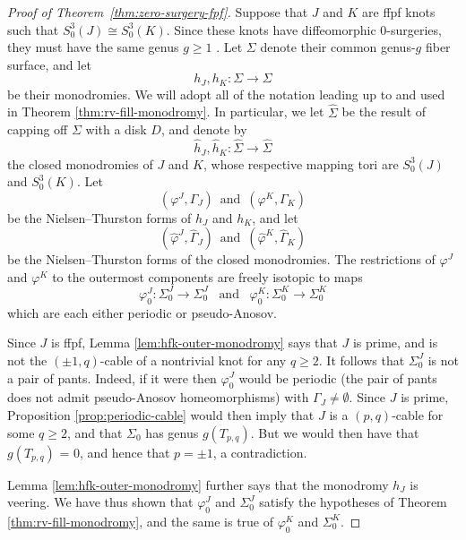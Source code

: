 \documentclass[11pt]{amsart}
\numberwithin{equation}{section}
\numberwithin{theorem}{section}
\theoremstyle{definition}
\begin{document}
\begin{proof}[Proof of Theorem~\ref{thm:zero-surgery-fpf}]
Suppose that $J$ and $ K$ are ffpf knots such that $S^3_0(J) \cong S^3_0(K)$. Since these knots have diffeomorphic $0$-surgeries, they must have the same genus $g \geq 1$ \cite{gabai-foliations3}. Let $\Sigma$ denote their common genus-$g$ fiber surface, and let 
\[ h_J, h_K: \Sigma \to \Sigma \]
be their monodromies.  We will  adopt all of the notation leading up to and used in Theorem \ref{thm:rv-fill-monodromy}. In particular, we let $\hat \Sigma$ be the result of capping off $\Sigma$ with a disk $D$, and denote by 
\[ \hat{h}_J, \hat{h}_K: \hat\Sigma \to \hat\Sigma \] the closed monodromies of $J$ and $K$, whose respective mapping tori are $S^3_0(J)$ and $S^3_0(K)$. Let \[(\varphi^J,\Gamma_J)\, \textrm{ and }\, (\varphi^K,\Gamma_K)\] be the Nielsen--Thurston forms of $h_J$ and $h_K$, and let \[(\hat\varphi^J,\hat\Gamma_J)\, \textrm{ and }\, (\hat\varphi^K,\hat\Gamma_K)\] be the Nielsen--Thurston forms of the closed monodromies. The restrictions of $\varphi^J$ and $\varphi^K$ to the outermost components are freely isotopic to maps 
\[\varphi_0^J:\Sigma_0^J\to \Sigma_0^J \,\,\, \textrm{ and } \,\,\, \varphi_0^K:\Sigma_0^K\to \Sigma_0^K\] which are each either periodic or pseudo-Anosov.

Since $J$ is ffpf, Lemma \ref{lem:hfk-outer-monodromy} says that $J$ is prime, and is not the $(\pm 1,q)$-cable of a nontrivial knot for any $q \geq 2$. It follows that $\Sigma_0^J$ is not a pair of pants. Indeed, if it were then $\varphi_0^J$ would be periodic (the pair of pants does not admit pseudo-Anosov homeomorphisms) with $\Gamma_J \neq \emptyset$. Since $J$ is prime, Proposition \ref{prop:periodic-cable} would then imply that $J$ is a $(p,q)$-cable for some $q\geq 2$, and that $\Sigma_0$ has genus $g(T_{p,q})$. But we would then have that   $g(T_{p,q})$ = 0, and hence that $p = \pm 1$, a contradiction. 

Lemma \ref{lem:hfk-outer-monodromy} further says that the monodromy $h_J$ is veering. We have thus shown that $\varphi_0^J$ and $\Sigma_0^J$ satisfy the hypotheses of Theorem \ref{thm:rv-fill-monodromy}, and the same is true of $\varphi_0^K$ and $\Sigma_0^K$. 


\end{proof}
\end{document}
